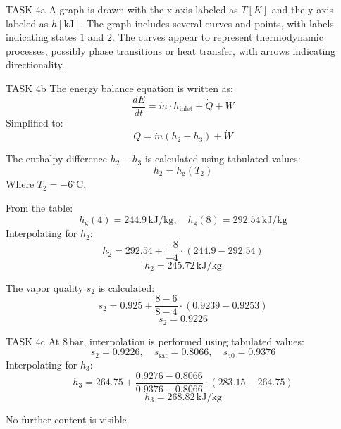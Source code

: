 TASK 4a  
A graph is drawn with the x-axis labeled as \( T [K] \) and the y-axis labeled as \( h [\text{kJ}] \). The graph includes several curves and points, with labels indicating states \( 1 \) and \( 2 \). The curves appear to represent thermodynamic processes, possibly phase transitions or heat transfer, with arrows indicating directionality.  

TASK 4b  
The energy balance equation is written as:  
\[
\frac{dE}{dt} = \dot{m} \cdot h_{\text{inlet}} + \dot{Q} + \dot{W}
\]  
Simplified to:  
\[
Q = \dot{m}(h_2 - h_3) + \dot{W}
\]  

The enthalpy difference \( h_2 - h_3 \) is calculated using tabulated values:  
\[
h_2 = h_{\text{g}}(T_2)
\]  
Where \( T_2 = -6^\circ\text{C} \).  

From the table:  
\[
h_{\text{g}}(4) = 244.9 \, \text{kJ/kg}, \quad h_{\text{g}}(8) = 292.54 \, \text{kJ/kg}
\]  
Interpolating for \( h_2 \):  
\[
h_2 = 292.54 + \frac{-8}{-4} \cdot (244.9 - 292.54)
\]  
\[
h_2 = 245.72 \, \text{kJ/kg}
\]  

The vapor quality \( s_2 \) is calculated:  
\[
s_2 = 0.925 + \frac{8 - 6}{8 - 4} \cdot (0.9239 - 0.9253)
\]  
\[
s_2 = 0.9226
\]  

TASK 4c  
At \( 8 \, \text{bar} \), interpolation is performed using tabulated values:  
\[
s_2 = 0.9226, \quad s_{\text{sat}} = 0.8066, \quad s_{40} = 0.9376
\]  
Interpolating for \( h_3 \):  
\[
h_3 = 264.75 + \frac{0.9276 - 0.8066}{0.9376 - 0.8066} \cdot (283.15 - 264.75)
\]  
\[
h_3 = 268.82 \, \text{kJ/kg}
\]  

No further content is visible.